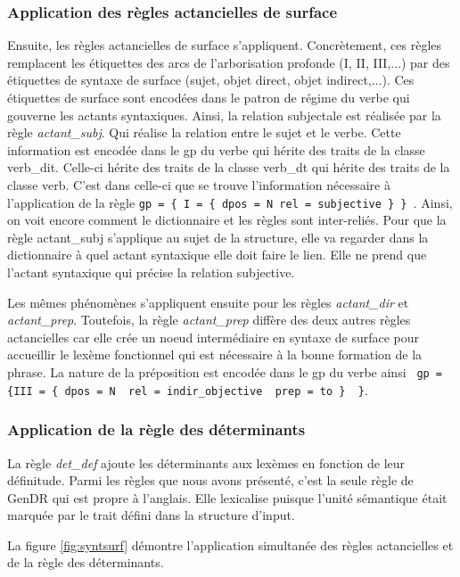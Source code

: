\subsubsection{Application des règles actancielles de surface}
Ensuite, les règles actancielles de surface s'appliquent. Concrètement, ces règles remplacent les étiquettes des arcs de l'arborisation profonde (I, II, III,...) par des étiquettes de syntaxe de surface (sujet, objet direct, objet indirect,...). Ces étiquettes de surface sont encodées dans le patron de régime du verbe qui gouverne les actants syntaxiques. Ainsi, la relation subjectale est réalisée par la règle \emph{actant\_subj}. Qui réalise la relation entre le sujet et le verbe. Cette information est encodée dans le gp du verbe  qui hérite des traits de la classe verb\_dit. Celle-ci hérite des traits de la classe verb\_dt qui hérite des traits de la classe verb. C'est dans celle-ci que se trouve l'information nécessaire à l'application de la règle \lstinline!gp = { I = { dpos = N rel = subjective } } !. Ainsi, on voit encore comment le dictionnaire et les règles sont inter-reliés. Pour que la règle actant\_subj s'applique au sujet de la structure, elle va regarder dans la dictionnaire à quel actant syntaxique elle doit faire le lien. Elle ne prend que l'actant syntaxique qui précise la relation subjective.

Les mêmes phénomènes s'appliquent ensuite pour les règles \emph{actant\_dir} et \emph{actant\_prep}. Toutefois, la règle \emph{actant\_prep} diffère des deux autres règles actancielles car elle crée un noeud intermédiaire en syntaxe de surface pour accueillir le lexème fonctionnel  qui est nécessaire à la bonne formation de la phrase. La nature de la préposition est encodée dans le gp du verbe ainsi \lstinline! gp = {III = { dpos = N  rel = indir_objective  prep = to }  }!.

\subsubsection{Application de la règle des déterminants}

La règle \emph{det\_def} ajoute les déterminants aux lexèmes en fonction de leur définitude. Parmi les règles que nous avons présenté, c'est la seule règle de GenDR qui est propre à l'anglais. Elle lexicalise  puisque l'unité sémantique  était marquée par le trait défini dans la structure d'input.

La figure \ref{fig:syntsurf} démontre l'application simultanée des règles actancielles et de la règle des déterminants.


